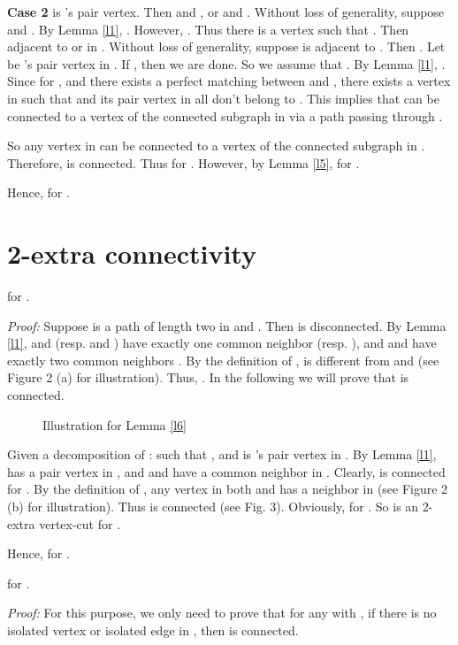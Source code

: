 \documentclass[preprint,number,12pt]{elsarticle}
\begin{document}
\textbf{Case 2 }  is 's pair vertex.
Then  and ,
or  and .
Without loss of generality, suppose  and .
By Lemma \ref{l1}, .
However, .
Thus there is a vertex  such that . 
Then  adjacent to  or  in . Without loss of generality, 
suppose  is adjacent to . Then .
Let  be 's pair vertex in . If , then we are done.
So we assume that .
By Lemma \ref{l1}, . Since
 for , and there exists a perfect matching between
 and , there
exists a vertex  in  such that  and its pair vertex  in 
all don't belong to .
This implies that  can be connected to a vertex of the connected subgraph  in
 via a path passing through .

So any vertex in  can be connected to a vertex of the connected subgraph  in . Therefore,  is connected.
Thus  for .
However, by Lemma \ref{l5},  for .

Hence,  for .






\section{2-extra connectivity}
\begin{lem}\label{l6}
 for .
\end{lem}
\emph{Proof:}
Suppose  is a path of length two in  and .
Then  is disconnected.
By Lemma \ref{l1},  and  (resp.  and ) have exactly one common neighbor  (resp. ), and  and  have exactly two common neighbors . By the definition of ,  is different from
 and  (see Figure 2 (a) for illustration).
Thus, .
In the following we will prove that  is connected.

\begin{figure}\centering
{}
\caption{Illustration for Lemma \ref{l6}}
\end{figure}


Given a decomposition of :  such that
, and  is 's pair vertex in .
By Lemma \ref{l1},  has a pair vertex  in ,
and  and  have a common neighbor  in .
Clearly,  is connected for . By the definition of ,
any vertex in both  and 
has a neighbor in  (see Figure 2 (b) for illustration). Thus  is connected (see Fig. 3).
Obviously,  for .
So  is an 2-extra vertex-cut for .

Hence,  for .


\begin{thm}\label{t2}
 for .
\end{thm}
\emph{Proof:}
For this purpose, we only need to prove that for any  with , if
there is no isolated vertex or isolated edge in , then  is connected.
\end{document}
